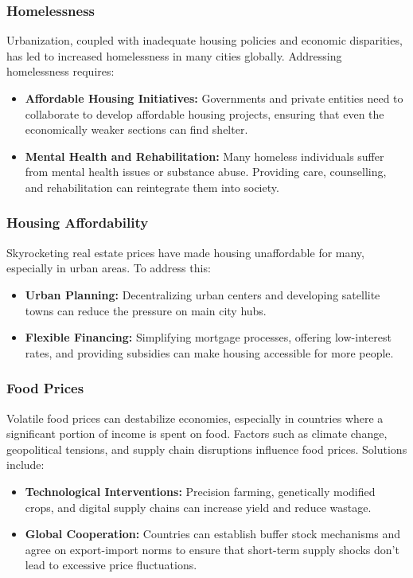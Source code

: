 \subsubsection*{Homelessness}
Urbanization, coupled with inadequate housing policies and economic disparities, has led to increased homelessness in many cities globally. Addressing homelessness requires:
\begin{itemize}
    \item \textbf{Affordable Housing Initiatives:} Governments and private entities need to collaborate to develop affordable housing projects, ensuring that even the economically weaker sections can find shelter.
    \item \textbf{Mental Health and Rehabilitation:} Many homeless individuals suffer from mental health issues or substance abuse. Providing care, counselling, and rehabilitation can reintegrate them into society.
\end{itemize}

\subsubsection*{Housing Affordability}
Skyrocketing real estate prices have made housing unaffordable for many, especially in urban areas. To address this:
\begin{itemize}
    \item \textbf{Urban Planning:} Decentralizing urban centers and developing satellite towns can reduce the pressure on main city hubs.
    \item \textbf{Flexible Financing:} Simplifying mortgage processes, offering low-interest rates, and providing subsidies can make housing accessible for more people.
\end{itemize}

\subsubsection*{Food Prices}
Volatile food prices can destabilize economies, especially in countries where a significant portion of income is spent on food. Factors such as climate change, geopolitical tensions, and supply chain disruptions influence food prices. Solutions include:
\begin{itemize}
    \item \textbf{Technological Interventions:} Precision farming, genetically modified crops, and digital supply chains can increase yield and reduce wastage.
    \item \textbf{Global Cooperation:} Countries can establish buffer stock mechanisms and agree on export-import norms to ensure that short-term supply shocks don't lead to excessive price fluctuations.
\end{itemize}

